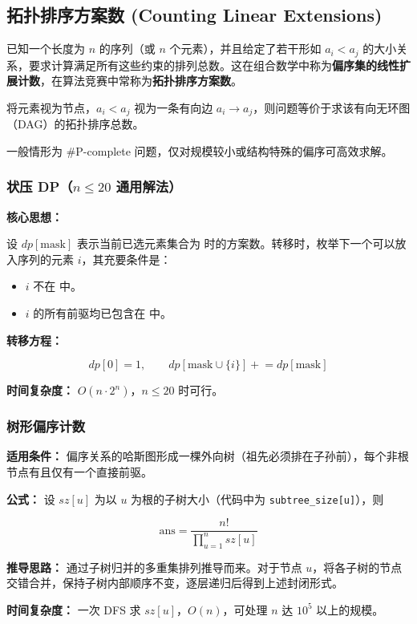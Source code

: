 

\subsection{拓扑排序方案数 (Counting Linear Extensions)}

已知一个长度为 $n$ 的序列（或 $n$ 个元素），并且给定了若干形如 $a_i < a_j$ 的大小关系，要求计算满足所有这些约束的排列总数。这在组合数学中称为\textbf{偏序集的线性扩展计数}，在算法竞赛中常称为\textbf{拓扑排序方案数}。

将元素视为节点，$a_i < a_j$ 视为一条有向边 $a_i \to a_j$，则问题等价于求该有向无环图（DAG）的拓扑排序总数。

一般情形为 \#P-complete 问题，仅对规模较小或结构特殊的偏序可高效求解。

\subsubsection{状压 DP（$n \le 20$ 通用解法）}

\textbf{核心思想：}

设 $\mathit{dp}[\text{mask}]$ 表示当前已选元素集合为  时的方案数。转移时，枚举下一个可以放入序列的元素 $i$，其充要条件是：

\begin{itemize}
  \item $i$ 不在  中。
  \item $i$ 的所有前驱均已包含在  中。
\end{itemize}

\textbf{转移方程：}

\[
\mathit{dp}[0] = 1,\qquad
\mathit{dp}[\text{mask} \cup \{i\}] \mathrel{+}= \mathit{dp}[\text{mask}]
\]

\textbf{时间复杂度：} $O(n \cdot 2^n)$，$n \le 20$ 时可行。



\subsubsection{树形偏序计数}

\textbf{适用条件：} 偏序关系的哈斯图形成一棵外向树（祖先必须排在子孙前），每个非根节点有且仅有一个直接前驱。

\textbf{公式：} 设 $sz[u]$ 为以 $u$ 为根的子树大小（代码中为 \texttt{subtree\_size[u]}），则

\[
\text{ans} = \frac{n!}{\displaystyle\prod_{u=1}^{n} sz[u]}
\]

\textbf{推导思路：} 通过子树归并的多重集排列推导而来。对于节点 $u$，将各子树的节点交错合并，保持子树内部顺序不变，逐层递归后得到上述封闭形式。

\textbf{时间复杂度：} 一次 DFS 求 $sz[u]$，$O(n)$，可处理 $n$ 达 $10^5$ 以上的规模。



